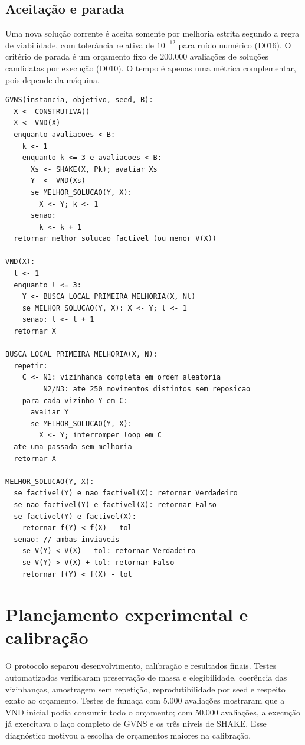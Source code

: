 \documentclass[10pt,twocolumn,a4paper]{article}
\begin{document}
\subsection{Aceitação e parada}

Uma nova solução corrente é aceita somente por melhoria estrita segundo a regra de viabilidade, com tolerância relativa de $10^{-12}$ para ruído numérico (D016). O critério de parada é um orçamento fixo de 200.000 avaliações de soluções candidatas por execução (D010). O tempo é apenas uma métrica complementar, pois depende da máquina.

\begin{lstlisting}[float=t, caption={Pseudocódigo consolidado da GVNS e da regra de viabilidade.}, label={lst:pseudocodigo}]
GVNS(instancia, objetivo, seed, B):
  X <- CONSTRUTIVA()
  X <- VND(X)
  enquanto avaliacoes < B:
    k <- 1
    enquanto k <= 3 e avaliacoes < B:
      Xs <- SHAKE(X, Pk); avaliar Xs
      Y  <- VND(Xs)
      se MELHOR_SOLUCAO(Y, X):
        X <- Y; k <- 1
      senao:
        k <- k + 1
  retornar melhor solucao factivel (ou menor V(X))

VND(X):
  l <- 1
  enquanto l <= 3:
    Y <- BUSCA_LOCAL_PRIMEIRA_MELHORIA(X, Nl)
    se MELHOR_SOLUCAO(Y, X): X <- Y; l <- 1
    senao: l <- l + 1
  retornar X

BUSCA_LOCAL_PRIMEIRA_MELHORIA(X, N):
  repetir:
    C <- N1: vizinhanca completa em ordem aleatoria
         N2/N3: ate 250 movimentos distintos sem reposicao
    para cada vizinho Y em C:
      avaliar Y
      se MELHOR_SOLUCAO(Y, X):
        X <- Y; interromper loop em C
  ate uma passada sem melhoria
  retornar X

MELHOR_SOLUCAO(Y, X):
  se factivel(Y) e nao factivel(X): retornar Verdadeiro
  se nao factivel(Y) e factivel(X): retornar Falso
  se factivel(Y) e factivel(X):
    retornar f(Y) < f(X) - tol
  senao: // ambas inviaveis
    se V(Y) < V(X) - tol: retornar Verdadeiro
    se V(Y) > V(X) + tol: retornar Falso
    retornar f(Y) < f(X) - tol
\end{lstlisting}

\section{Planejamento experimental e calibração}

O protocolo separou desenvolvimento, calibração e resultados finais. Testes automatizados verificaram preservação de massa e elegibilidade, coerência das vizinhanças, amostragem sem repetição, reprodutibilidade por seed e respeito exato ao orçamento. Testes de fumaça com 5.000 avaliações mostraram que a VND inicial podia consumir todo o orçamento; com 50.000 avaliações, a execução já exercitava o laço completo de GVNS e os três níveis de SHAKE. Esse diagnóstico motivou a escolha de orçamentos maiores na calibração.
\end{document}
